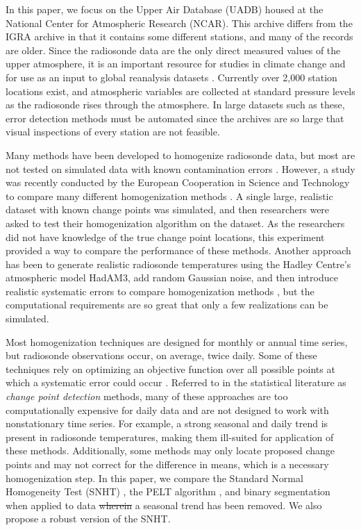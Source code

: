 \documentclass[12pt]{article}
\providecommand{\DIFaddtex}[1]{{\protect\color{blue}\uwave{#1}}} %
\providecommand{\DIFdeltex}[1]{{\protect\color{red}\sout{#1}}}                      %
\providecommand{\DIFaddbegin}{} %
\providecommand{\DIFaddend}{} %
\providecommand{\DIFdelbegin}{} %
\providecommand{\DIFdelend}{} %
\providecommand{\DIFadd}[1]{\texorpdfstring{\DIFaddtex{#1}}{#1}} %
\providecommand{\DIFdel}[1]{\texorpdfstring{\DIFdeltex{#1}}{}} %
\begin{document}
\begin{doublespacing}
In this paper, we  focus on the Upper Air Database (UADB) housed at the National Center for Atmospheric Research (NCAR). This archive differs from the IGRA archive in that it contains some different stations, and many of the records are older. Since the radiosonde data are the only direct measured values of the upper atmosphere, it is an important resource for studies in climate change \cite{elliott91, eskridge95} and for use as an input to global reanalysis datasets \cite{kalnay96, kanamitsu02}. Currently over 2,000 station locations exist, and atmospheric variables are collected at standard pressure levels as the radiosonde rises through the atmosphere. In large datasets such as these,  error detection methods must be automated since the archives are so large that visual inspections of every station are not feasible.

Many methods have been developed to homogenize radiosonde data, but most are not tested on simulated data with known contamination errors \cite{eskridge95, haimberger07, haimberger12, lanzante96, lanzante03, venema12}.  However, a study was recently conducted by the European Cooperation in Science and Technology to compare many different homogenization methods \cite{venema12}.  A single large, realistic dataset with known change points was simulated, and then researchers were asked to test their homogenization algorithm on the dataset.  As the researchers did not have knowledge of the true change point locations, this experiment provided a way to compare the performance of  these  methods.  Another approach has been to generate realistic radiosonde temperatures using the Hadley Centre's atmospheric model HadAM3, add random Gaussian noise, and then introduce realistic systematic errors to compare homogenization methods \cite{titchner09, thorne11}, but the computational requirements are so great that only a few  realizations can be simulated.

Most homogenization techniques are designed for monthly or annual time series, but radiosonde observations occur, on average, twice daily.  Some of these techniques rely on optimizing an objective function over all possible points at which a systematic error could occur  \cite{killick12, li14, lu10, scott74}.  Referred to in the statistical literature as \emph{change point detection} methods,   many of these approaches are too computationally expensive for daily data and are not designed to work with nonstationary time series.  For example, a strong seasonal and daily trend is present in radiosonde temperatures, making them ill-suited for application of these methods.  Additionally, some methods may only locate proposed change points and may not correct for the difference in means, which is a necessary homogenization step.  In this paper, we compare the Standard Normal Homogeneity Test (SNHT) \cite{alexandersson86}, the PELT algorithm \cite{killick12}, and binary segmentation \cite{scott74} when applied to data \DIFdelbegin \DIFdel{wherein }\DIFdelend \DIFaddbegin \DIFadd{with }\DIFaddend a seasonal trend \DIFaddbegin \DIFadd{and for which a seasonal trend }\DIFaddend has been removed.  We also propose a robust version of the SNHT.


\end{doublespacing}
\end{document}
